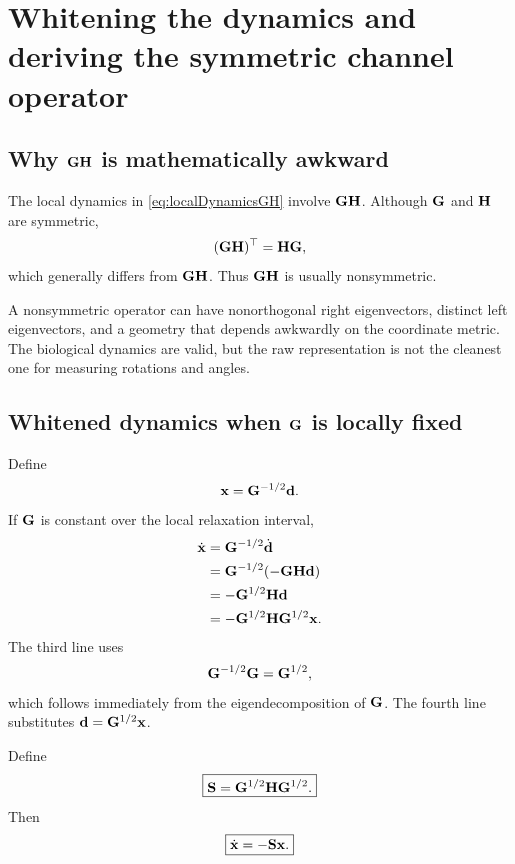 \chapter{Whitening the dynamics and deriving the symmetric channel operator}

\section{Why \(\mathbf{G}\mathbf{H}\) is mathematically awkward}

The local dynamics in \cref{eq:localDynamicsGH} involve \(\mathbf{G}\mathbf{H}\). Although \(\mathbf{G}\) and \(\mathbf{H}\) are symmetric,
\begin{equation}
(\mathbf{G}\mathbf{H})^\top=\mathbf{H}\mathbf{G},
\end{equation}
which generally differs from \(\mathbf{G}\mathbf{H}\). Thus \(\mathbf{G}\mathbf{H}\) is usually nonsymmetric.

\inwords A nonsymmetric operator can have nonorthogonal right eigenvectors, distinct left eigenvectors, and a geometry that depends awkwardly on the coordinate metric. The biological dynamics are valid, but the raw representation is not the cleanest one for measuring rotations and angles.

\section{Whitened dynamics when \(\mathbf{G}\) is locally fixed}

Define
\begin{equation}
\mathbf x=\mathbf{G}^{-1/2}\mathbf d.
\end{equation}
If \(\mathbf{G}\) is constant over the local relaxation interval,
\begin{align}
\dot{\mathbf x}
&=\mathbf{G}^{-1/2}\dot{\mathbf d}\\
&=\mathbf{G}^{-1/2}(-\mathbf{G}\mathbf{H}\mathbf d)\\
&=-\mathbf{G}^{1/2}\mathbf{H}\mathbf d\\
&=-\mathbf{G}^{1/2}\mathbf{H}\mathbf{G}^{1/2}\mathbf x.
\end{align}
The third line uses
\begin{equation}
\mathbf{G}^{-1/2}\mathbf{G}=\mathbf{G}^{1/2},
\end{equation}
which follows immediately from the eigendecomposition of \(\mathbf{G}\). The fourth line substitutes \(\mathbf d=\mathbf{G}^{1/2}\mathbf x\).

Define
\begin{equation}
\boxed{\mathbf{S}=\mathbf{G}^{1/2}\mathbf{H}\mathbf{G}^{1/2}.}
\label{eq:channelOperator}
\end{equation}
Then
\begin{equation}
\boxed{\dot{\mathbf x}=-\mathbf{S}\mathbf x.}
\label{eq:whitenedDynamics}
\end{equation}

